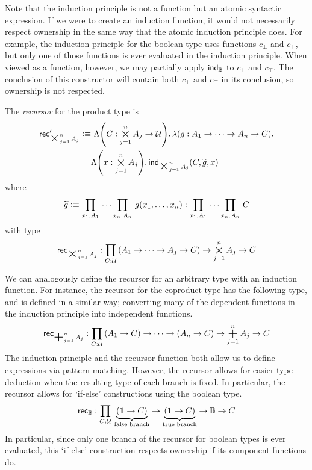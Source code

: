 \documentclass[11pt]{book}
\DeclareMathOperator*{\bigplus}{\scalerel*{+}{\textstyle\sum}}
\DeclareMathOperator*{\bigtimes}{\scalerel*{\times}{\textstyle\sum}}
\begin{document}
Note that the induction principle is not a function but an atomic syntactic expression.
If we were to create an induction function, it would not necessarily respect ownership in the same way that the atomic induction principle does.
For example, the induction principle for the boolean type uses functions \( c_\bot \) and \( c_\top \), but only one of those functions is ever evaluated in the induction principle.
When viewed as a function, however, we may partially apply \( \mathsf{ind}_{\mathbb B} \) to \( c_\bot \) and \( c_\top \).
The conclusion of this constructor will contain both \( c_\bot \) and \( c_\top \) in its conclusion, so ownership is not respected.
\begin{defn}
  The \textit{recursor} for the product type is
  \begin{align*}
    \rec{\bigtimes_{j=1}^n A_j}' \defeq &\ \Lambda\qty(C:\bigtimes_{j=1}^n A_j \to \UU).\,\lambda\qty(g:A_1 \to \dots \to A_n \to C).\\
    &\Lambda\qty(x:\bigtimes_{j=1}^n A_j).\,\ind{\bigtimes_{j=1}^n A_j}(C,\widetilde g,x)
  \end{align*}
  where
  \[
    \widetilde g \defeq \prd{x_1:A_1} \cdots \prd{x_n:A_n} g(x_1, \dots, x_n) : \prd{x_1:A_1} \cdots \prd{x_n:A_n} C
  \]
  with type
  \[
    \rec{\bigtimes_{j=1}^n A_j} : \prd{C:\UU} (A_1 \to \dots \to A_j \to C) \to \bigtimes_{j=1}^n A_j \to C
  \]
\end{defn}
We can analogously define the recursor for an arbitrary type with an induction function.
For instance, the recursor for the coproduct type has the following type, and is defined in a similar way; converting many of the dependent functions in the induction principle into independent functions.
\[
  \rec{\bigplus_{j=1}^n A_j} : \prd{C:\UU} (A_1 \to C) \to \cdots \to (A_n \to C) \to \bigplus_{j=1}^n A_j \to C
\]
The induction principle and the recursor function both allow us to define expressions via pattern matching.
However, the recursor allows for easier type deduction when the resulting type of each branch is fixed.
In particular, the recursor allows for `if-else' constructions using the boolean type.
\[
  \rec{\mathbb B} : \prd{C:\UU} \underbrace{(\unit \to C)}_{\text{false branch}} \to \underbrace{(\unit \to C)}_{\text{true branch}} \to \mathbb B \to C
\]
In particular, since only one branch of the recursor for boolean types is ever evaluated, this `if-else' construction respects ownership if its component functions do.
\end{document}
